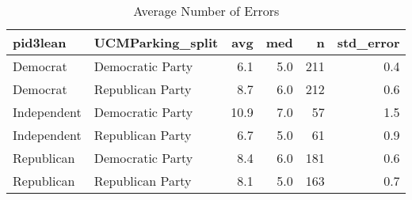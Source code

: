 \begin{table}[!htb]
\centering
\caption{Average Number of Errors} 
\label{tab:parking_sum}
\begin{tabular}{llrrrr}
  \hline
pid3lean & UCMParking\_split & avg & med & n & std\_error \\ 
  \hline
Democrat     & Democratic Party & 6.1 & 5.0 & 211 & 0.4 \\ 
  Democrat     & Republican Party & 8.7 & 6.0 & 212 & 0.6 \\ 
  Independent  & Democratic Party & 10.9 & 7.0 & 57 & 1.5 \\ 
  Independent  & Republican Party & 6.7 & 5.0 & 61 & 0.9 \\ 
  Republican   & Democratic Party & 8.4 & 6.0 & 181 & 0.6 \\ 
  Republican   & Republican Party & 8.1 & 5.0 & 163 & 0.7 \\ 
   \hline
\end{tabular}
\end{table}
